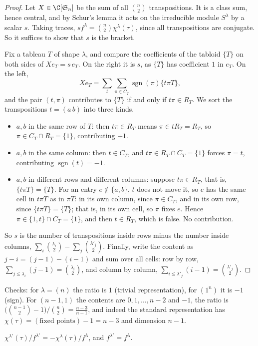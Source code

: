 \begin{proof}
Let $X\in\C[\mathfrak S_n]$ be the sum of all $\binom n2$ transpositions. It is a class sum, hence central, and by Schur's lemma it acts on the irreducible module $S^\lambda$ by a scalar $s$. Taking traces, $sf^\lambda=\binom n2\chi^\lambda(\tau)$,
since all transpositions are conjugate. So it suffices to show that $s$ is the bracket.

Fix a tableau $T$ of shape $\lambda$, and compare the coefficients of the tabloid $\{T\}$ on both sides of $Xe_T=s\,e_T$. On the right it is $s$, as $\{T\}$ has coefficient $1$ in $e_T$. On the left,
\[
Xe_T=\sum_t\sum_{\pi\in C_T}\operatorname{sgn}(\pi)\{t\pi T\},
\]
and the pair $(t,\pi)$ contributes to $\{T\}$ if and only if $t\pi\in R_T$. We sort the transpositions $t=(a\,b)$ into three kinds.
\begin{itemize}
\item $a,b$ in the same row of $T$: then $t\pi\in R_T$ means $\pi\in tR_T=R_T$, so $\pi\in C_T\cap R_T=\{1\}$, contributing $+1$.
\item $a,b$ in the same column: then $t\in C_T$, and $t\pi\in R_T\cap C_T=\{1\}$ forces $\pi=t$, contributing $\operatorname{sgn}(t)=-1$.
\item $a,b$ in different rows and different columns: suppose $t\pi\in R_T$, that is, $\{t\pi T\}=\{T\}$. For an entry $e\notin\{a,b\}$, $t$ does not move it, so $e$ has the same cell in $t\pi T$ as in $\pi T$: in its own column, since $\pi\in C_T$,
and in its own row, since $\{t\pi T\}=\{T\}$; that is, in its own cell, so $\pi$ fixes $e$. Hence $\pi\in\{1,t\}\cap C_T=\{1\}$, and then $t\in R_T$, which is false. No contribution.
\end{itemize}
So $s$ is the number of transpositions inside rows minus the number inside columns, $\sum_i\binom{\lambda_i}2-\sum_j\binom{\lambda'_j}2$. Finally, write the content as $j-i=(j-1)-(i-1)$ and sum over all cells: row by row, $\sum_{j\le\lambda_i}(j-1)=\binom{\lambda_i}2$, and column by column, $\sum_{i\le\lambda'_j}(i-1)=\binom{\lambda'_j}2$.
\end{proof}

Checks: for $\lambda=(n)$ the ratio is $1$ (trivial representation), for $(1^n)$ it is $-1$ (sign). For $(n-1,1)$ the contents are $0,1,\dots,n-2$ and $-1$, the ratio is $\bigl(\binom{n-1}2-1\bigr)/\binom n2=\frac{n-3}{n-1}$, and indeed the standard
representation has $\chi(\tau)=(\text{fixed points})-1=n-3$ and dimension $n-1$.

\begin{corollary}\label{cor:conjugate}
$\chi^{\lambda'}(\tau)/f^{\lambda'}=-\chi^\lambda(\tau)/f^\lambda$, and $f^{\lambda'}=f^\lambda$.
\end{corollary}

